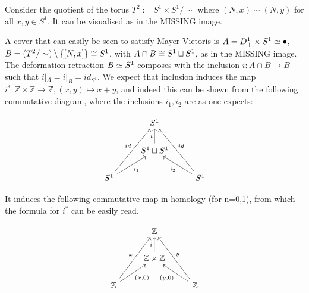 \begin{example}
Consider the quotient of the torus $T^2:= S^1 \times S^1/\sim$ where $(N,x)\sim (N,y)$ for all $x,y \in S^1$. It can be visualised as in the MISSING image.

A cover that can easily be seen to satisfy Mayer-Vietoris is $A=D^1_+ \times S^1 \simeq \bullet$, $B=(T^2/\sim) \setminus\{[N,x]\}\cong S^1$, with $A\cap B \cong S^1\sqcup S^1$, as in the MISSING image. The deformation retraction $B\simeq S^1$ composes with the inclusion $i:A\cap B\rightarrow B$ such that $i|_A=i|_B =id_{S^1}$. We expect that inclusion induces the map $i^*:\mathbb{Z}\times \mathbb{Z}\rightarrow \mathbb{Z}, (x,y)\mapsto x+y$, and indeed this can be shown from the following commutative diagram, where the inclusions $i_1,i_2$ are as one expects:

\[\begin{tikzcd}
                                         & S^1                           &                                          \\
                                         & S^1 \sqcup S^1 \arrow[u, "i"] &                                          \\
S^1 \arrow[ru, "i_1"'] \arrow[ruu, "id"] &                               & S^1 \arrow[lu, "i_2"] \arrow[luu, "id"']
\end{tikzcd}\]

It induces the following commutative map in homology (for n=0,1), from which the formula for $i^*$ can be easily read. 

\[\begin{tikzcd}
                                                   & \mathbb{Z}                                 &                                                    \\
                                                   & \mathbb{Z}\times \mathbb{Z} \arrow[u, "i"] &                                                    \\
\mathbb{Z} \arrow[ru, "{(x,0)}"'] \arrow[ruu, "x"] &                                            & \mathbb{Z} \arrow[lu, "{(y,0)}"] \arrow[luu, "y"']
\end{tikzcd}\]


\end{example}

